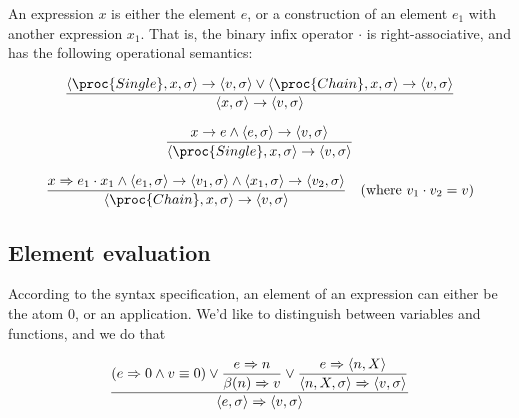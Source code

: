An expression $x$ is either the element $e$, or a construction of an element
$e_1$ with another expression $x_1$. That is, the binary infix operator $\cdot$
is right-associative, and has the following operational semantics:

\everymath{\displaystyle}

\begin{equation}
{\displaystyle
  \left\langle \proc{Single}, x,\sigma\right\rangle
  \rightarrow
  \left\langle v,\sigma\right\rangle
\vee
  \left\langle \proc{Chain}, x,\sigma\right\rangle
  \rightarrow
  \left\langle v,\sigma\right\rangle
\over\displaystyle
  \left\langle x,\sigma\right\rangle
  \rightarrow
  \left\langle v,\sigma\right\rangle
}
\end{equation}

\begin{equation}
{\displaystyle
  x\rightarrow e
\wedge
  \left\langle e,\sigma\right\rangle
  \rightarrow
  \left\langle v,\sigma\right\rangle
\over\displaystyle
  \left\langle \proc{Single}, x,\sigma\right\rangle
  \rightarrow
  \left\langle v,\sigma\right\rangle
}
\end{equation}

\begin{equation}
{\displaystyle
  x\Rightarrow e_1\cdot x_1
\wedge
  \left\langle e_1,\sigma\right\rangle
  \rightarrow
  \left\langle v_1,\sigma\right\rangle
\wedge
  \left\langle x_1,\sigma\right\rangle
  \rightarrow
  \left\langle v_2,\sigma\right\rangle
\over\displaystyle
  \left\langle \proc{Chain}, x, \sigma\right\rangle
  \rightarrow
  \left\langle v, \sigma\right\rangle
}
\quad(\text{where }v_1\cdot v_2=v)
\end{equation}

\subsection{Element evaluation}

According to the syntax specification, an element of an expression can either
be the atom $0$, or an application. We'd like to distinguish between variables
and functions, and we do that  

\begin{equation}
{\displaystyle
\left(
    e\Rightarrow 0
  \wedge
    v\equiv 0
\right)
\vee
{\displaystyle
    e\Rightarrow n
\over\displaystyle
    \beta(n)\Rightarrow v
}
\vee
{\displaystyle
    e\Rightarrow \left\langle n, X\right\rangle
\over\displaystyle
    \left\langle n,X,\sigma\right\rangle
    \Rightarrow
    \left\langle v,\sigma\right\rangle
}
\over\displaystyle
\left\langle e,\sigma\right\rangle
\Rightarrow
\left\langle v,\sigma\right\rangle
}
\end{equation}

